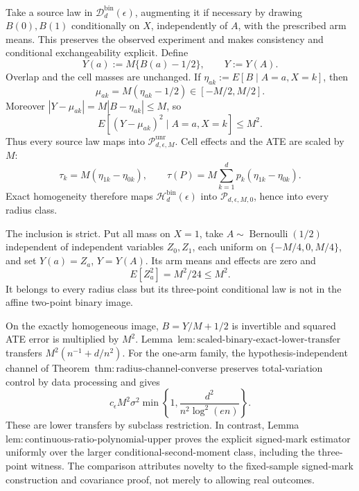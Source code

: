 Take a source law in \(\mathcal D_d^{\mathrm{bin}}(\epsilon)\), augmenting it if necessary by drawing \(B(0),B(1)\) conditionally on \(X\), independently of \(A\), with the prescribed arm means.  This preserves the observed experiment and makes consistency and conditional exchangeability explicit.  Define
\[
 Y(a):=M\{B(a)-1/2\},\qquad Y:=Y(A).
\tag{1}
\]
Overlap and the cell masses are unchanged.  If \(\eta_{ak}:=E[B\mid A=a,X=k]\), then
\[
 \mu_{ak}=M(\eta_{ak}-1/2)\in[-M/2,M/2].
\tag{2}
\]
Moreover \(|Y-\mu_{ak}|=M|B-\eta_{ak}|\le M\), so
\[
 E[(Y-\mu_{ak})^2\mid A=a,X=k]\le M^2.
\tag{3}
\]
Thus every source law maps into \(\mathcal P_{d,\epsilon,M}^{\mathrm{unr}}\).  Cell effects and the ATE are scaled by \(M\):
\[
 \tau_k=M(\eta_{1k}-\eta_{0k}),\qquad
 \tau(P)=M\sum_{k=1}^dp_k(\eta_{1k}-\eta_{0k}).
\tag{4}
\]
Exact homogeneity therefore maps \(\mathcal H_d^{\mathrm{bin}}(\epsilon)\) into \(\mathcal P_{d,\epsilon,M,0}\), hence into every radius class.

The inclusion is strict.  Put all mass on \(X=1\), take \(A\sim\operatorname{Bernoulli}(1/2)\) independent of independent variables \(Z_0,Z_1\), each uniform on \(\{-M/4,0,M/4\}\), and set \(Y(a)=Z_a\), \(Y=Y(A)\).  Its arm means and effects are zero and
\[
 E[Z_a^2]=M^2/24\le M^2.
\tag{5}
\]
It belongs to every radius class but its three-point conditional law is not in the affine two-point binary image.

On the exactly homogeneous image, \(B=Y/M+1/2\) is invertible and squared ATE error is multiplied by \(M^2\).  Lemma~\(\mathrm{lem:scaled\text{-}binary\text{-}exact\text{-}lower\text{-}transfer}\) transfers \(M^2(n^{-1}+d/n^2)\).  For the one-arm family, the hypothesis-independent channel of Theorem~\(\mathrm{thm:radius\text{-}channel\text{-}converse}\) preserves total-variation control by data processing and gives
\[
 c_\epsilon M^2\sigma^2\min\left\{1,\frac{d^2}{n^2\log^2(en)}\right\}.
\tag{6}
\]
These are lower transfers by subclass restriction.  In contrast, Lemma~\(\mathrm{lem:continuous\text{-}ratio\text{-}polynomial\text{-}upper}\) proves the explicit signed-mark estimator uniformly over the larger conditional-second-moment class, including the three-point witness.  The comparison attributes novelty to the fixed-sample signed-mark construction and covariance proof, not merely to allowing real outcomes.